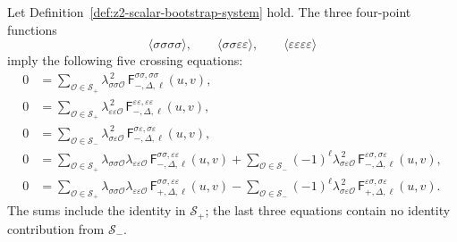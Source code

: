 \begin{proposition}
\label{prop:ising-mixed-five-crossing-equations}
Let Definition~\ref{def:z2-scalar-bootstrap-system} hold.  The three
four-point functions
\[
  \langle\sigma\sigma\sigma\sigma\rangle,\qquad
  \langle\sigma\sigma\varepsilon\varepsilon\rangle,\qquad
  \langle\varepsilon\varepsilon\varepsilon\varepsilon\rangle
\]
imply the following five crossing equations:
\begin{align}
  0
  &=
  \sum_{\mathcal O\in\mathcal S_+}
  \lambda_{\sigma\sigma\mathcal O}^{\,2}\,
  \mathsf F_{-,\Delta,\ell}^{\sigma\sigma,\sigma\sigma}(u,v),
  \label{eq:ising-mixed-ss-ss-crossing}
  \\
  0
  &=
  \sum_{\mathcal O\in\mathcal S_+}
  \lambda_{\varepsilon\varepsilon\mathcal O}^{\,2}\,
  \mathsf F_{-,\Delta,\ell}^{\varepsilon\varepsilon,\varepsilon\varepsilon}(u,v),
  \label{eq:ising-mixed-ee-ee-crossing}
  \\
  0
  &=
  \sum_{\mathcal O\in\mathcal S_-}
  \lambda_{\sigma\varepsilon\mathcal O}^{\,2}\,
  \mathsf F_{-,\Delta,\ell}^{\sigma\varepsilon,\sigma\varepsilon}(u,v),
  \label{eq:ising-mixed-se-se-crossing}
  \\
  0
  &=
  \sum_{\mathcal O\in\mathcal S_+}
  \lambda_{\sigma\sigma\mathcal O}
  \lambda_{\varepsilon\varepsilon\mathcal O}\,
  \mathsf F_{-,\Delta,\ell}^{\sigma\sigma,\varepsilon\varepsilon}(u,v)
  +
  \sum_{\mathcal O\in\mathcal S_-}
  (-1)^\ell\lambda_{\sigma\varepsilon\mathcal O}^{\,2}\,
  \mathsf F_{-,\Delta,\ell}^{\varepsilon\sigma,\sigma\varepsilon}(u,v),
  \label{eq:ising-mixed-crossing-minus}
  \\
  0
  &=
  \sum_{\mathcal O\in\mathcal S_+}
  \lambda_{\sigma\sigma\mathcal O}
  \lambda_{\varepsilon\varepsilon\mathcal O}\,
  \mathsf F_{+,\Delta,\ell}^{\sigma\sigma,\varepsilon\varepsilon}(u,v)
  -
  \sum_{\mathcal O\in\mathcal S_-}
  (-1)^\ell\lambda_{\sigma\varepsilon\mathcal O}^{\,2}\,
  \mathsf F_{+,\Delta,\ell}^{\varepsilon\sigma,\sigma\varepsilon}(u,v).
  \label{eq:ising-mixed-crossing-plus}
\end{align}
The sums include the identity in \(\mathcal S_+\); the last three equations
contain no identity contribution from \(\mathcal S_-\).
\end{proposition}

